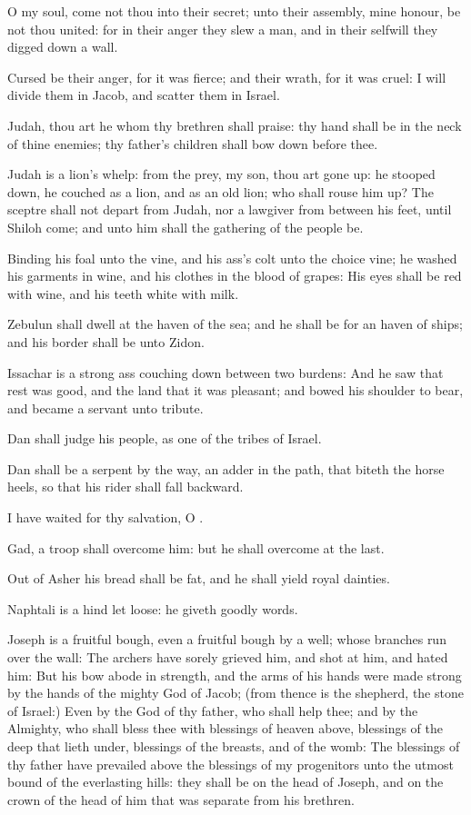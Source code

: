 \verse O my soul, come not thou into their secret; unto their assembly,
mine honour, be not thou united: for in their anger they slew a man,
and in their selfwill they digged down a wall.

\verse Cursed be their anger, for it was fierce; and their wrath, for it
was cruel: I will divide them in Jacob, and scatter them in Israel.

\verse Judah, thou art he whom thy brethren shall praise: thy hand shall
be in the neck of thine enemies; thy father's children shall bow down
before thee.

\verse Judah is a lion's whelp: from the prey, my son, thou art gone up:
he stooped down, he couched as a lion, and as an old lion; who shall
rouse him up?  \verse The sceptre shall not depart from Judah, nor a
lawgiver from between his feet, until Shiloh come; and unto him shall
the gathering of the people be.

\verse Binding his foal unto the vine, and his ass's colt unto the
choice vine; he washed his garments in wine, and his clothes in the
blood of grapes: \verse His eyes shall be red with wine, and his teeth
white with milk.

\verse Zebulun shall dwell at the haven of the sea; and he shall be for
an haven of ships; and his border shall be unto Zidon.

\verse Issachar is a strong ass couching down between two burdens:
\verse And he saw that rest was good, and the land that it was
pleasant; and bowed his shoulder to bear, and became a servant unto
tribute.

\verse Dan shall judge his people, as one of the tribes of Israel.

\verse Dan shall be a serpent by the way, an adder in the path, that
biteth the horse heels, so that his rider shall fall backward.

\verse I have waited for thy salvation, O \LORD.

\verse Gad, a troop shall overcome him: but he shall overcome at the
last.

\verse Out of Asher his bread shall be fat, and he shall yield royal
dainties.

\verse Naphtali is a hind let loose: he giveth goodly words.

\verse Joseph is a fruitful bough, even a fruitful bough by a well;
whose branches run over the wall: \verse The archers have sorely
grieved him, and shot at him, and hated him: \verse But his bow abode
in strength, and the arms of his hands were made strong by the hands
of the mighty God of Jacob; (from thence is the shepherd, the stone of
Israel:) \verse Even by the God of thy father, who shall help thee; and
by the Almighty, who shall bless thee with blessings of heaven above,
blessings of the deep that lieth under, blessings of the breasts, and
of the womb: \verse The blessings of thy father have prevailed above
the blessings of my progenitors unto the utmost bound of the
everlasting hills: they shall be on the head of Joseph, and on the
crown of the head of him that was separate from his brethren.

